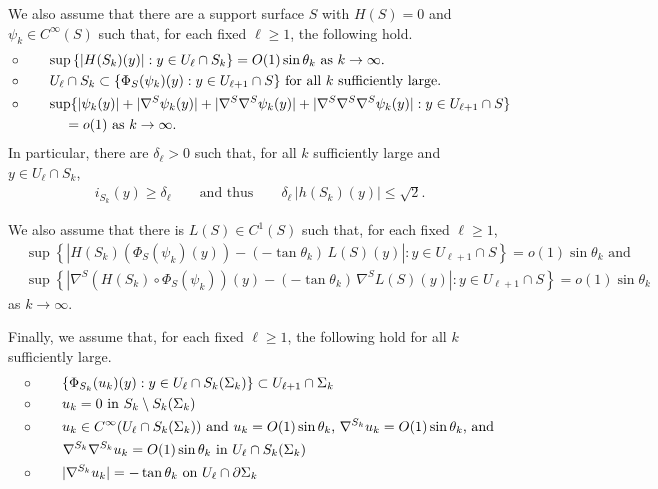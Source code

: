 \documentclass[11pt]{amsart}
\begin{document}
	 We also assume that there are a support surface $S$ with $H(S)=0$ and $\psi_k\in C^\infty(S)$ such that, for each fixed $\ell\geq1$,  the following hold.
	 \begin{align}
	 	\label{S assumption 3}&\circ\qquad \sup\left\{|H(S_k)(y)|:y\in U_\ell\cap S_k\right\}=O(1)\sin\theta_k\text{ as $k\to\infty$.}\\
	 	\label{S assumption 1} &\circ \qquad U_\ell\cap S_k \subset \{\Phi_S(\psi_k)(y):y\in U_{\ell+1}\cap S\}\text{ for all $k$ sufficiently large}.\\
	 	\label{S assumption 2}&\circ \qquad \sup\{|\psi_k(y)|+|\nabla^S\psi_k(y)|+|\nabla^S\nabla^S\psi_k(y)|+|\nabla^S\nabla^S\nabla^S\psi_k(y)|:y\in U_{\ell+1}\cap S\}\\&\qquad\qquad\notag=o(1)\text{ as $k\to\infty$.} 
	 \end{align}
	 In particular, there are  $\delta_\ell>0$ such that, for all $k$ sufficiently large and $y\in U_\ell \cap S_k$,
	 \begin{align}
i_{S_k}(y)\geq \delta_\ell	\qquad\text{and thus}\qquad  \delta_\ell\,|h(S_k)(y)|\leq \sqrt{2}.
	 \end{align}
	 
	  
	We also assume that there is $L(S)\in C^1(S)$ such that, for each fixed $\ell \geq 1$,
	 \begin{equation}\label{S assumption 4}
	  \begin{aligned}
	 & 	 \sup\left\{|H(S_k)(\Phi_S(\psi_k)(y))-(-\tan\theta_k)\,L(S)(y)|:y\in U_{\ell+1}\cap S\right\}=o(1)\sin\theta_k\text{ and}
	 \\
	 &\sup\left\{|\nabla ^S( H(S_k)\circ\Phi_S(\psi_k))(y)-(-\tan\theta_k)\,\nabla^S L(S)(y)|:y\in U_{\ell+1}\cap S\right\}
 =o(1)\sin\theta_k
	  \end{aligned}
	  \end{equation} 
	  as $k\to\infty$.
	
	 
	
	
	Finally, we assume that, for each fixed $\ell \geq 1$,  the following hold for all $k$  sufficiently large.
	\begin{align}
		\label{u assumption 1}	&\circ\qquad  \text{$\{\Phi_{S_k}(u_k)(y):y\in U_{\ell}\cap  S_k(\Sigma_k)\}\subset U_{\ell+1}\cap \Sigma_k$}\hspace{3cm}\\ 		
			\label{u assumption 2}	&\circ\qquad \text{$u_k=0$ in $S_k\setminus S_k(\Sigma_k)$} \\
			&\circ\qquad \text{$ u_k\in C^\infty(U_{\ell}\cap S_k(\Sigma_k))$}
				\label{u assumption 5}	 \text{ and $u_k=O(1)\sin\theta_k$, $\nabla^{S_k} u_k=O(1)\sin\theta_k$, and }
				\\\notag &\qquad \quad \text{$\nabla^{S_k}\nabla^{S_k} u_k=O(1)\sin\theta_k$ in $U_{\ell}\cap  S_k(\Sigma_k)$}\\ 
		\label{u assumption 6}	&\circ\qquad \text{$|\nabla^{S_k} u_k|=-\tan\theta_k$ on $U_{\ell}\cap \partial \Sigma_k $}
	\end{align}
\end{document}
